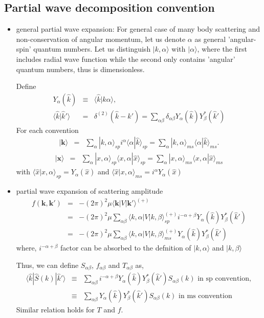 \documentclass[10pt]{book}
\def\bm{\boldsymbol}
\newcommand{\bea}{\begin{eqnarray}}
\newcommand{\eea}{\end{eqnarray}}
\newcommand{\no}{\nonumber \\}
\def\vk{{\bm k}}
\def\vx{{\bm x}}
\def\la{\langle}
\def\ra{\rangle}
\begin{document}
\subsection{Partial wave decomposition convention }
\begin{itemize}

\item general partial wave expansion: 
For general case of many body scattering and 
non-conservation of angular momentum, let us
denote $\alpha$ as general
'angular-spin' quantum numbers. 
Let us distinguish
$|k,\alpha\ra$ with $|\alpha\ra$, where the first includes
radial wave function while the second only contains 
'angular' quantum numbers, thus is dimensionless. 

Define
\bea
Y_{\alpha}(\hat{k})&\equiv&\la \hat{k}|k \alpha\ra,\no
\la \hat{k}|\hat{k}'\ra&=&\delta^{(2)}(\hat{k}-\hat{k}')
 =\sum_{\alpha\beta}\delta_{\alpha\beta} 
  Y_{\alpha}(\hat{k})Y_{\beta}^*(\hat{k}')
\eea
For each convention
\bea
|\vk\ra&=&
\sum_\alpha |k, \alpha\ra_{sp}  
                i^\alpha \la \alpha|\hat{k}\ra_{sp}
                =
\sum_\alpha |k, \alpha\ra_{ms}  
            \la \alpha|\hat{k}\ra_{ms}.
\eea
\bea
|\vx\ra&=&\sum_{\alpha} |x,\alpha\ra_{sp} 
           \la x,\alpha|\hat{x}\ra_{sp}
       =\sum_{\alpha} |x,\alpha\ra_{ms} 
           \la x,\alpha|\hat{x}\ra_{ms}
\eea
with $\la \hat{x}|x,\alpha \ra_{sp}=Y_{\alpha}(\hat{x})$
and $\la \hat{x}|x,\alpha \ra_{ms}=i^\alpha Y_{\alpha}(\hat{x})$

\item partial wave expansion of scattering amplitude
\bea
f(\vk,\vk')&=&-(2\pi)^2\mu \la \vk|V|\vk'\ra^{(+)}\no
           &=&-(2\pi)^2\mu \sum_{\alpha\beta} 
        \la k,\alpha|V| k,\beta\ra^{(+)}_{sp}
        i^{-\alpha+\beta}
        Y_{\alpha}(\hat{k})Y_{\beta}^*(\hat{k}') \no
        &=&-(2\pi)^2\mu \sum_{\alpha\beta} 
        \la k,\alpha|V| k,\beta\ra^{(+)}_{ms}
        Y_{\alpha}(\hat{k})Y_{\beta}^*(\hat{k}')  
\eea
where, $i^{-\alpha+\beta}$ factor can be absorbed to the defnition of $|k,\alpha\ra $
and $|k,\beta\ra $

Thus, we can define $S_{\alpha\beta}$, $f_{\alpha\beta}$ and
$T_{\alpha\beta}$ as,
\bea
\la \hat{k}|\hat{S}(k)|\hat{k}'\ra&\equiv&
      \sum_{\alpha\beta} i^{-\alpha+\beta}
      Y_{\alpha}(\hat{k})Y_{\beta}^*(\hat{k}') S_{\alpha\beta}(k)
      \mbox{ in sp convention}
      ,\no
      &\equiv&
      \sum_{\alpha\beta}
      Y_{\alpha}(\hat{k})Y_{\beta}^*(\hat{k}') S_{\alpha\beta}(k)
      \mbox{ in ms convention}
\eea
Similar relation holds for $T$ and $f$.


\end{itemize}
\end{document}
